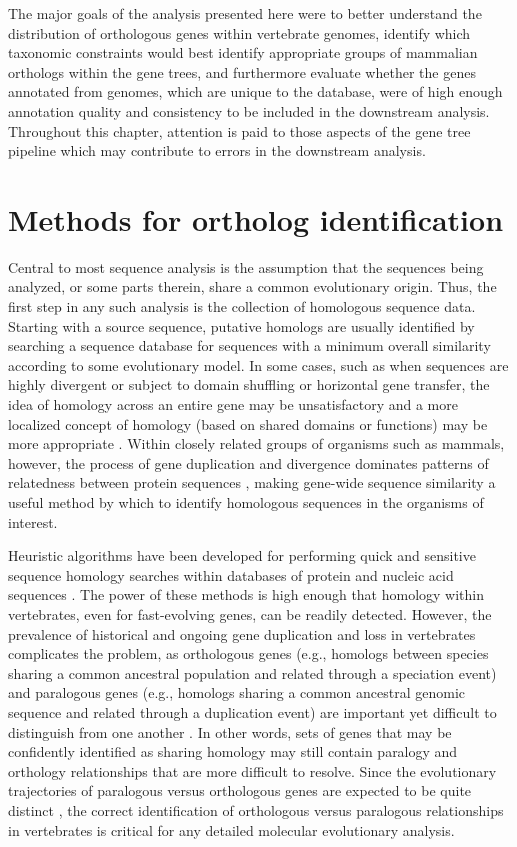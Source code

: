 The major goals of the analysis presented here were to better
understand the distribution of orthologous genes within vertebrate
genomes, identify which taxonomic constraints would best identify
appropriate groups of mammalian orthologs within the \cmp gene trees,
and furthermore evaluate whether the genes annotated from \lcv
genomes, which are unique to the \cmp database, were of high enough
annotation quality and consistency to be included in the downstream
analysis. Throughout this chapter, attention is paid to those aspects
of the \cmp gene tree pipeline which may contribute to errors in the
downstream analysis.

\section{Methods for ortholog identification}

Central to most sequence analysis is the assumption that the sequences
being analyzed, or some parts therein, share a common evolutionary
origin. Thus, the first step in any such analysis is the collection of
homologous sequence data. Starting with a source sequence, putative
homologs are usually identified by searching a sequence database for
sequences with a minimum overall similarity according to some
evolutionary model. In some cases, such as when sequences are highly
divergent or subject to domain shuffling or horizontal gene transfer,
the idea of homology across an entire gene may be unsatisfactory and a
more localized concept of homology (based on shared domains or
functions) may be more appropriate
\citep{Koonin2001,Sjolander2011}. Within closely related groups of
organisms such as mammals, however, the process of gene duplication
and divergence dominates patterns of relatedness between protein
sequences \citep{Ohno1970}, making gene-wide sequence similarity a
useful method by which to identify homologous sequences in the
organisms of interest.

Heuristic algorithms have been developed for performing quick and
sensitive sequence homology searches within databases of protein and
nucleic acid sequences \citep{Altschul1997,Eddy2009}. The power of
these methods is high enough that homology within vertebrates, even
for fast-evolving genes, can be readily detected. However, the
prevalence of historical and ongoing gene duplication and loss in
vertebrates complicates the problem, as orthologous genes (e.g.,
homologs between species sharing a common ancestral population and
related through a speciation event) and paralogous genes (e.g.,
homologs sharing a common ancestral genomic sequence and related
through a duplication event) are important yet difficult to
distinguish from one another \citep{Jun2009}. In other words, sets of
genes that may be confidently identified as sharing homology may still
contain paralogy and orthology relationships that are more difficult
to resolve. Since the evolutionary trajectories of paralogous versus
orthologous genes are expected to be quite distinct \citep{Lynch2000},
the correct identification of orthologous versus paralogous
relationships in vertebrates is critical for any detailed molecular
evolutionary analysis.

